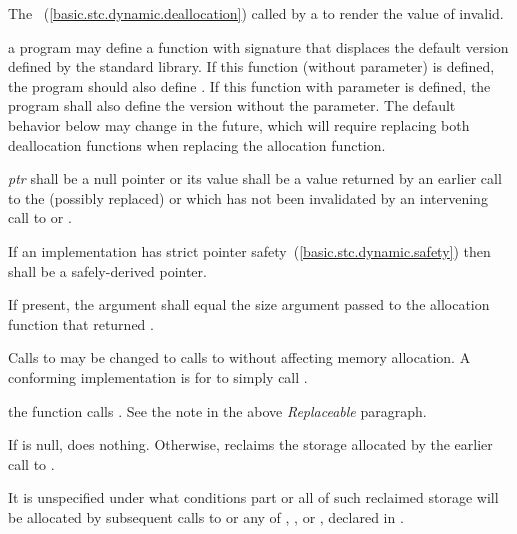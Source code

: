 \begin{itemdescr}
\pnum
\effects
The
~(\ref{basic.stc.dynamic.deallocation})
called by a
to render the value of  invalid.

\pnum
\replaceable
a \Cpp program may define a function with signature
that displaces the default version defined by the
\Cpp standard library. If this function (without  parameter) is defined,
the program should also define
.
If this function with  parameter is defined, the program shall also
define the version without the  parameter.
\enternote The default behavior below may change in the future, which will require
replacing both deallocation functions when replacing the allocation function.
\exitnote

\pnum
\requires
\textit{ptr} shall be a null pointer or
its value shall be a value returned by an
earlier call to the (possibly replaced)
or
which has not been invalidated by an intervening call to
 or
.

\pnum
\requires
If an implementation has strict pointer safety~(\ref{basic.stc.dynamic.safety})
then  shall be a safely-derived pointer.

\pnum
\requires If present, the  argument shall equal the size
argument passed to the allocation function that returned .

\pnum
\required Calls to  may be changed
to calls to  without affecting memory allocation.
\enternote A conforming implementation is for
 to simply call
. \exitnote

\pnum
{} the function  calls
.
\enternote See the note in the above \textit{Replaceable} paragraph. \exitnote

\pnum
{}
If  is null, does nothing. Otherwise, reclaims the
storage allocated by the earlier call to .

\pnum
\remarks
It is unspecified under what conditions part or all of such
%
reclaimed storage will be allocated by subsequent
calls to
or any of
,
,
or
,
declared in
.
\end{itemdescr}

